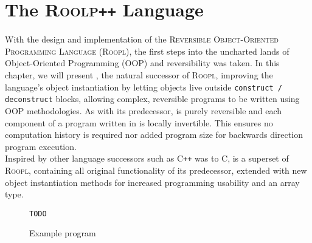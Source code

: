 \chapter{The \textsc{Roolp\texttt{++}} Language}
\label{chp:rooplpp}
With the design and implementation of the \textsc{Reversible Object-Oriented Programming Language} (\textsc{Roopl}), the first steps into the uncharted lands of Object-Oriented Programming (OOP) and reversibility was taken. In this chapter, we will present \rooplpp, the natural successor of \textsc{Roopl}, improving the language's object instantiation by letting objects live outside \texttt{construct / deconstruct} blocks, allowing complex, reversible programs to be written using OOP methodologies. As with its predecessor, \rooplpp is purely reversible and each component of a program written in \rooplpp is locally invertible. This ensures no computation history is required nor added program size for backwards direction program execution.\\

Inspired by other language successors such as \textsc{C\texttt{++}} was to \textsc{C}, \rooplpp is a superset of \textsc{Roopl}, containing all original functionality of its predecessor, extended with new object instantiation methods for increased programming usability and an array type.

\begin{figure}
    \texttt{TODO}
    \caption{Example \rooplpp program}   
\end{figure}
\newpage

